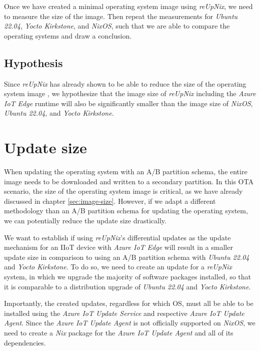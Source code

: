 Once we have created a minimal operating system image using \textit{reUpNix}, we
need to measure the size of the image. Then repeat the measurements for
\textit{Ubuntu 22.04}, \textit{Yocto Kirkstone}, and \textit{NixOS}, such that
we are able to compare the operating systems and draw a conclusion.

\subsection{Hypothesis}
Since \textit{reUpNix} has already shown to be able to reduce the size of the
operating system image \cite{gollenstede:23:lctes}, we hypothesize that the
image size of \textit{reUpNix} including the \textit{Azure IoT Edge} runtime
will also be significantly smaller than the image size of \textit{NixOS},
\textit{Ubuntu 22.04}, and \textit{Yocto Kirkstone}.


\section{Update size}
\label{sec:update-size}
When updating the operating system with an A/B partition schema, the entire
image needs to be downloaded and written to a secondary partition. In this
\ac{OTA} scenario, the size of the operating system image is critical, as we have
already discussed in chapter \ref{sec:image-size}.
However, if we adapt a different methodology than an A/B partition schema
for updating the operating system, we can potentially reduce the update size
drastically.

We want to establish if using \textit{reUpNix}'s differential updates as the
update mechanism for an \ac{IIoT} device with \textit{Azure IoT Edge}
will result in a smaller update size in comparison to using an A/B partition schema with
\textit{Ubuntu 22.04} and \textit{Yocto Kirkstone}. To do so, we need to create
an update for a \textit{reUpNix} system, in which we upgrade the majority
of software packages installed, so that it is comparable to a distribution upgrade
of \textit{Ubuntu 22.04} and \textit{Yocto Kirkstone}.

Importantly, the created updates, regardless for which \ac{OS}, must all be
able to be installed using the \textit{Azure IoT Update Service} and respective
\textit{Azure IoT Update Agent}. Since the \textit{Azure IoT Update Agent} is
not officially supported on \textit{NixOS}, we need to create a \textit{Nix} package
for the \textit{Azure IoT Update Agent} and all of its dependencies.

